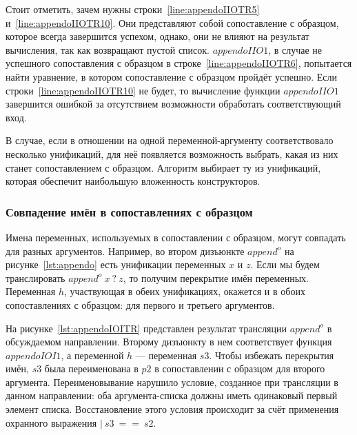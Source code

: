 Стоит отметить, зачем нужны строки~\ref{line:appendoIIOTR5} и~\ref{line:appendoIIOTR10}.
Они представляют собой сопоставление с образцом, которое всегда завершится успехом, однако, они не влияют на результат вычисления, так как возвращают пустой список.
$appendoIIO1$, в случае не успешного сопоставления с образцом в строке~\ref{line:appendoIIOTR6}, попытается найти уравнение, в котором сопоставление с образцом пройдёт успешно.
Если строки~\ref{line:appendoIIOTR10} не будет, то вычисление функции $appendoIIO1$ завершится ошибкой за отсутствием возможности обработать соответствующий вход.

В случае, если в отношении на \miniKanren{} одной переменной-аргументу соответствовало несколько унификаций, для неё появляется возможность выбрать, какая из них станет сопоставлением с образцом.
Алгоритм выбирает ту из унификаций, которая обеспечит наибольшую вложенность конструкторов.


\subsubsection{Совпадение имён в сопоставлениях с образцом}

Имена переменных, используемых в сопоставлении с образцом, могут совпадать для разных аргументов.
Например, во втором дизъюнкте $append^o$ на рисунке~\ref{lst:appendo} есть унификации переменных $x$ и $z$.
Если мы будем транслировать $append^o \ x \ ? \ z$, то получим перекрытие имён переменных.
Переменная $h$, участвующая в обеих унификациях, окажется и в обоих сопоставлениях с образцом: для первого и третьего аргументов.

На рисунке~\ref{lst:appendoIOITR} представлен результат трансляции $append^o$ в обсуждаемом направлении.
Второму дизъюнкту в нем соответствует функция $appendoIOI1$, а переменной $h$ --- переменная $s3$.
Чтобы избежать перекрытия имён, $s3$ была переименована в $p2$ в сопоставлении с образцом для второго аргумента.
Переименовывание нарушило условие, созданное при трансляции в данном направлении: оба аргумента-списка должны иметь одинаковый первый элемент списка.
Восстановление этого условия происходит за счёт применения охранного выражения $|~s3~==~s2$.

